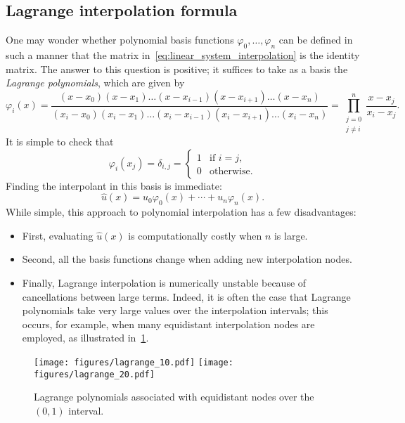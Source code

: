 \subsection{Lagrange interpolation formula}
One may wonder whether polynomial basis functions $\varphi_0, \dotsc, \varphi_n$ can be defined in such a manner that
the matrix in~\eqref{eq:linear_system_interpolation} is the identity matrix.
The answer to this question is positive;
it suffices to take as a basis the \emph{Lagrange polynomials},
which are given by
\[
    \varphi_{i}(x)
    = \frac{(x - x_0) (x - x_1) \dotsc (x - x_{i-1}) (x - x_{i+1}) \dotsc (x - x_n)}
    {(x_i - x_0) (x_i - x_1) \dotsc (x_i - x_{i-1}) (x_i - x_{i+1}) \dotsc (x_i - x_n)}
    = \prod_{\substack{j = 0\\ j \neq i}}^{n} \frac {x - x_j} {x_i - x_j}.
\]
It is simple to check that
\[
    \varphi_i(x_j) =
    \delta_{i,j} =
    \begin{cases}
        1 & \text{if $i = j$}, \\
        0 & \text{otherwise.}
    \end{cases}
\]
Finding the interpolant in this basis is immediate:
\[
    \widehat u(x) = u_0 \varphi_0(x) + \dotsb + u_n \varphi_n(x).
\]
While simple, this approach to polynomial interpolation has a few disadvantages:
\begin{itemize}
    \item
        First, evaluating $\widehat u(x)$ is computationally costly when $n$ is large.

    \item
        Second, all the basis functions change when adding new interpolation nodes.

    \item
        Finally, Lagrange interpolation is numerically unstable because of cancellations between large terms.
        Indeed, it is often the case that Lagrange polynomials take very large values over the interpolation intervals;
        this occurs, for example,
        when many equidistant interpolation nodes are employed,
        as illustrated in~\cref{fig:lagrange}.
\end{itemize}
\begin{figure}[ht]
    \centering
    \texttt{[image: figures/lagrange\_10.pdf]}
    \texttt{[image: figures/lagrange\_20.pdf]}
    \caption{Lagrange polynomials associated with equidistant nodes over the $(0, 1)$ interval.}%
    \label{fig:lagrange}
\end{figure}

